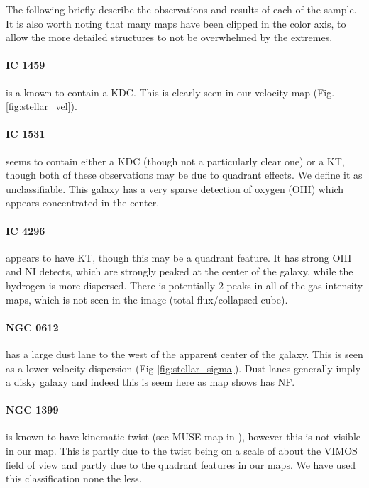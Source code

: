 \documentclass[fleqn,usenatbib,useAMS]{mnras}
\begin{document}
	The following briefly describe the observations and results of each of the sample. It is also worth noting that many maps have been clipped in the color axis, to allow the more detailed structures to not be overwhelmed by the extremes. 

	\paragraph{IC 1459} is a known to contain a KDC. This is clearly seen in our velocity map (Fig. \ref{fig:stellar_vel}).

	\paragraph{IC 1531} seems to contain either a KDC (though not a particularly clear one) or a KT, though both of these observations may be due to quadrant effects. We define it as unclassifiable. This galaxy has a very sparse detection of oxygen (OIII) which appears concentrated in the center.

	\paragraph{IC 4296} appears to have KT, though this may be a quadrant feature. It has strong OIII and NI detects, which are strongly peaked at the center of the galaxy, while the hydrogen is more dispersed. There is potentially 2 peaks in all of the gas intensity maps, which is not seen in the image (total flux/collapsed cube).

	\paragraph{NGC 0612} has a large dust lane to the west of the apparent center of the galaxy. This is seen as a lower velocity dispersion (Fig \ref{fig:stellar_sigma}). Dust lanes generally imply a disky galaxy and indeed this is seem here as map shows has NF. 

	\paragraph{NGC 1399} is known to have kinematic twist (see MUSE map in \citet{Zieleniewski2017}), however this is not visible in our map. This is partly due to the twist being on a scale of about the VIMOS field of view and partly due to the quadrant features in our maps. We have used this classification none the less. 
\end{document}
